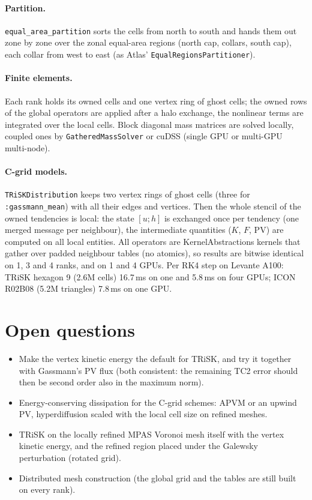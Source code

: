 \documentclass[11pt,a4paper]{article}
\newcommand{\code}[1]{\texttt{#1}}
\begin{document}
\paragraph{Partition.} \code{equal\_area\_partition} sorts the cells from north
to south and hands them out zone by zone over the zonal equal-area regions (north
cap, collars, south cap), each collar from west to east (as Atlas'
\code{EqualRegionsPartitioner}).

\paragraph{Finite elements.} Each rank holds its owned cells and one vertex
ring of ghost cells; the owned rows of the global operators are applied after a
halo exchange, the nonlinear terms are integrated over the local cells. Block
diagonal mass matrices are solved locally, coupled ones by
\code{GatheredMassSolver} or cuDSS (single GPU or multi-GPU multi-node).

\paragraph{C-grid models.} \code{TRiSKDistribution} keeps two vertex rings of
ghost cells (three for \code{:gassmann\_mean}) with all their edges and
vertices. Then the whole stencil of the owned tendencies is local: the state
$[u;h]$ is exchanged once per tendency (one merged message per neighbour), the
intermediate quantities ($K$, $F$, PV) are computed on all local entities. All
operators are KernelAbstractions kernels that gather over padded neighbour tables
(no atomics), so results are bitwise identical on 1, 3 and 4 ranks, and on 1 and 4 GPUs.
Per RK4 step on Levante A100: TRiSK hexagon 9 (2.6M cells) 16.7\,ms on one and
5.8\,ms on four GPUs; ICON R02B08 (5.2M triangles) 7.8\,ms on one GPU.

\section{Open questions}

\begin{itemize}
\item Make the vertex kinetic energy the default for TRiSK, and try it together
  with Gassmann's PV flux (both consistent: the remaining TC2 error should then be
  second order also in the maximum norm).
\item Energy-conserving dissipation for the C-grid schemes: APVM or an upwind PV,
  hyperdiffusion scaled with the local cell size on refined meshes.
\item TRiSK on the locally refined MPAS Voronoi mesh itself with the vertex
  kinetic energy, and the refined region placed under the Galewsky perturbation
  (rotated grid).
\item Distributed mesh construction (the global grid and the tables are still built
  on every rank).
\end{itemize}
\end{document}
